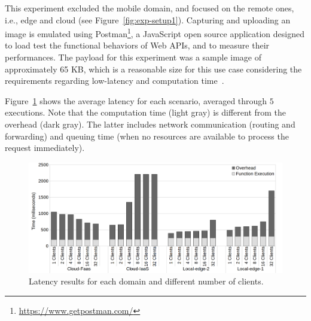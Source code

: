 This experiment excluded the mobile domain, and focused on the remote ones, i.e., edge and cloud (see Figure~\ref{fig:exp-setup1}). Capturing and uploading an image is emulated using Postman\footnote{\url{https://www.getpostman.com/}}, a JavaScript open source application designed to load test the functional behaviors of Web APIs, and to measure their performances. The  payload for this experiment was a sample image of approximately 65 KB, which is a reasonable size for this use case considering the requirements regarding low-latency and computation time~\cite{rodriguez16mobile}. 





 






 Figure~\ref{fig:latency-domains} shows the average latency for each scenario, averaged through $5$ executions. Note that the computation time (light gray) is different from the overhead (dark gray). The latter includes network communication (routing and forwarding) and queuing time (when no resources are available to process the request immediately). 

\begin{figure}
	
	\centering
	\includegraphics[width=1\textwidth]{figs/latency-domains}
	\caption{Latency results for each domain and different number of clients.}
	\label{fig:latency-domains}
\end{figure}

